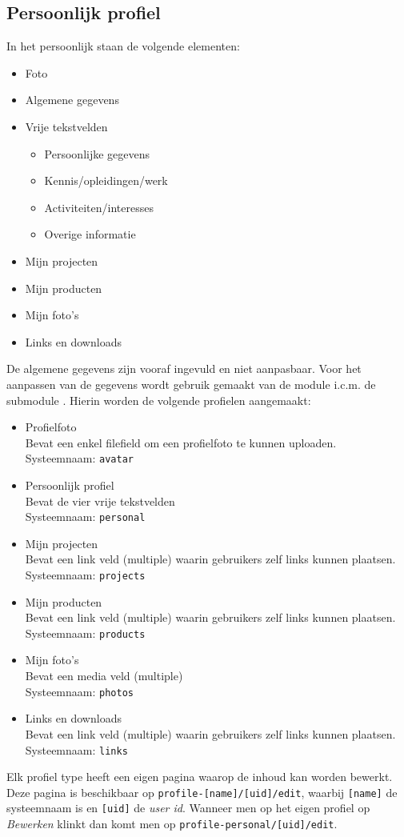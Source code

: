 \subsection{Persoonlijk profiel}\label{profiel}

In het persoonlijk staan de volgende elementen:
\begin{itemize}
\item Foto
\item Algemene gegevens
\item Vrije tekstvelden
\begin{itemize}
\item Persoonlijke gegevens
\item Kennis/opleidingen/werk
\item Activiteiten/interesses
\item Overige informatie
\end{itemize}
\item Mijn projecten
\item Mijn producten
\item Mijn foto's
\item Links en downloads
\end{itemize}
De algemene gegevens zijn vooraf ingevuld en niet aanpasbaar.
Voor het aanpassen van de gegevens wordt gebruik gemaakt van de  module i.c.m. de submodule . Hierin worden de volgende profielen aangemaakt:
\begin{itemize}
\item Profielfoto \\ Bevat een enkel filefield om een profielfoto te kunnen uploaden.
\\ Systeemnaam: \texttt{avatar}
\item Persoonlijk profiel \\ Bevat de vier vrije tekstvelden
\\ Systeemnaam: \texttt{personal}
\item Mijn projecten \\ Bevat een link veld (multiple) waarin gebruikers zelf links kunnen plaatsen.
\\ Systeemnaam: \texttt{projects}
\item Mijn producten \\ Bevat een link veld (multiple) waarin gebruikers zelf links kunnen plaatsen.
\\ Systeemnaam: \texttt{products}
\item Mijn foto's \\ Bevat een media veld (multiple)
\\ Systeemnaam: \texttt{photos}
\item Links en downloads \\ Bevat een link veld (multiple) waarin gebruikers zelf links kunnen plaatsen.
\\ Systeemnaam: \texttt{links}
\end{itemize}
Elk profiel type heeft een eigen pagina waarop de inhoud kan worden bewerkt. Deze pagina is beschikbaar op \texttt{profile-[name]/[uid]/edit}, waarbij \texttt{[name]} de systeemnaam is en \texttt{[uid]} de \emph{user id}. Wanneer men op het eigen profiel op \emph{Bewerken} klinkt dan komt men op \texttt{profile-personal/[uid]/edit}.

